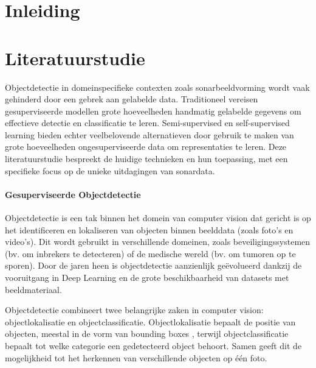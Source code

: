 
\section{Inleiding}%
\label{sec:inleiding}



\section{Literatuurstudie}%
\label{sec:literatuurstudie}

Objectdetectie in domeinspecifieke contexten zoals sonarbeeldvorming wordt vaak gehinderd door een gebrek aan gelabelde data. Traditioneel vereisen gesuperviseerde modellen grote hoeveelheden handmatig gelabelde gegevens om effectieve detectie en classificatie te leren. Semi-supervised en self-supervised learning bieden echter veelbelovende alternatieven door gebruik te maken van grote hoeveelheden ongesuperviseerde data om representaties te leren. Deze literatuurstudie bespreekt de huidige technieken en hun toepassing, met een specifieke focus op de unieke uitdagingen van sonardata.

\paragraph{Gesuperviseerde Objectdetectie}

Objectdetectie is een tak binnen het domein van computer vision dat gericht is op het identificeren en lokaliseren van objecten binnen beelddata (zoals foto's en video's). Dit wordt gebruikt in verschillende domeinen, zoals beveiligingssystemen (bv. om inbrekers te detecteren) of de medische wereld (bv. om tumoren op te sporen). Door de jaren heen is objectdetectie aanzienlijk geëvolueerd dankzij de vooruitgang in Deep Learning en de grote beschikbaarheid van datasets met beeldmateriaal. \autocite{He_2016} 

Objectdetectie combineert twee belangrijke zaken in computer vision: objectlokalisatie en objectclassificatie. Objectlokalisatie bepaalt de positie van objecten, meestal in de vorm van bounding boxes \autocite{Tompson_2015}, terwijl objectclassificatie bepaalt tot welke categorie een gedetecteerd object behoort. Samen geeft dit de mogelijkheid tot het herkennen van verschillende objecten op één foto.

